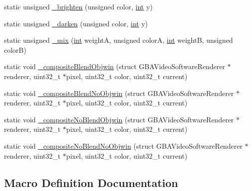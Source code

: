 \begin{DoxyCompactItemize}
\item 
static unsigned \mbox{\hyperlink{software-private_8h_a7e90735a7e93c877a09e1975f18ca5c9}{\+\_\+brighten}} (unsigned color, \mbox{\hyperlink{ioapi_8h_a787fa3cf048117ba7123753c1e74fcd6}{int}} y)
\item 
static unsigned \mbox{\hyperlink{software-private_8h_a68f599c06dc71b78236e144e7e86e136}{\+\_\+darken}} (unsigned color, \mbox{\hyperlink{ioapi_8h_a787fa3cf048117ba7123753c1e74fcd6}{int}} y)
\item 
static unsigned \mbox{\hyperlink{software-private_8h_a8ea8e737e4315c934bc23a636752df7a}{\+\_\+mix}} (\mbox{\hyperlink{ioapi_8h_a787fa3cf048117ba7123753c1e74fcd6}{int}} weightA, unsigned colorA, \mbox{\hyperlink{ioapi_8h_a787fa3cf048117ba7123753c1e74fcd6}{int}} weightB, unsigned colorB)
\item 
static void \mbox{\hyperlink{software-private_8h_a194890ebd968b26526048988c98e3f7a}{\+\_\+composite\+Blend\+Objwin}} (struct G\+B\+A\+Video\+Software\+Renderer $\ast$renderer, uint32\+\_\+t $\ast$pixel, uint32\+\_\+t color, uint32\+\_\+t current)
\item 
static void \mbox{\hyperlink{software-private_8h_a7f6ac8624c7426eac5b84e727fd81ea6}{\+\_\+composite\+Blend\+No\+Objwin}} (struct G\+B\+A\+Video\+Software\+Renderer $\ast$renderer, uint32\+\_\+t $\ast$pixel, uint32\+\_\+t color, uint32\+\_\+t current)
\item 
static void \mbox{\hyperlink{software-private_8h_aaa1d30026aabbefc56e79c9a8bfa9d65}{\+\_\+composite\+No\+Blend\+Objwin}} (struct G\+B\+A\+Video\+Software\+Renderer $\ast$renderer, uint32\+\_\+t $\ast$pixel, uint32\+\_\+t color, uint32\+\_\+t current)
\item 
static void \mbox{\hyperlink{software-private_8h_ab5f6e59594dee5b7f6ec7d9e5b5fa91f}{\+\_\+composite\+No\+Blend\+No\+Objwin}} (struct G\+B\+A\+Video\+Software\+Renderer $\ast$renderer, uint32\+\_\+t $\ast$pixel, uint32\+\_\+t color, uint32\+\_\+t current)
\end{DoxyCompactItemize}


\subsection{Macro Definition Documentation}
\mbox{\label{software-private_8h_ad68095029f1769b7966be63d8506fec5}} 
